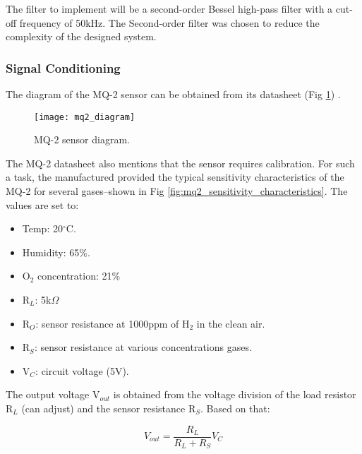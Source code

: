 The filter to implement will be a second-order Bessel high-pass filter with a cut-off frequency of 50kHz. The Second-order filter was chosen to reduce the complexity of the designed system.

\newpage

\subsubsection{Signal Conditioning}
\label{sec:methodology:dev_methodology:sc}
\hspace{8pt}
The diagram of the MQ-2 sensor can be obtained from its datasheet (Fig \ref{fig:mq2_diagram}) \cite{mq2_datasheet}.

\begin{figure}[ht]
    \centering\texttt{[image: mq2\_diagram]}
    \caption{MQ-2 sensor diagram.}
    \label{fig:mq2_diagram}
\end{figure}

The MQ-2 datasheet also mentions that the sensor requires calibration. For such a task, the manufactured provided the typical sensitivity characteristics of the MQ-2 for several gases--shown in Fig \ref{fig:mq2_sensitivity_characteristics}. The values are set to:

\begin{itemize}
    \item Temp: 20$^{\circ}$C.

    \item Humidity: 65\%.

    \item O$_{2}$ concentration: 21\%

    \item R$_{L}$: 5k$\Omega$

    \item R$_{O}$: sensor resistance at 1000ppm of H$_{2}$ in the clean air.

    \item R$_{S}$: sensor resistance at various concentrations gases.

    \item V$_{C}$: circuit voltage (5V). \\
\end{itemize}

The output voltage V$_{out}$ is obtained from the voltage division of the load resistor R$_{L}$ (can adjust) and the sensor resistance R$_{S}$. Based on that:

\begin{equation}
    V_{out} = \frac{R_{L}}{R_{L} + R_{S}} V_{C}
    \label{eq:voltage_division}
\end{equation}

